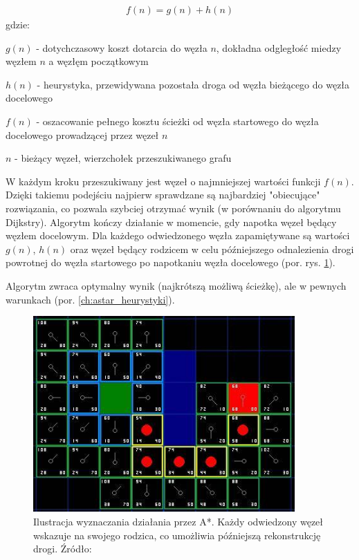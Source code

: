 \begin{gather}
 	f(n) = g(n) + h(n)
 	\label{eq_astar} 
\end{gather}
 gdzie:

 $g(n)$ - dotychczasowy koszt dotarcia do węzła $n$, dokładna odgległość miedzy węzłem $n$ a węzłęm początkowym

 $h(n)$ - heurystyka, przewidywana pozostała droga od węzła bieżącego do węzła docelowego

 $f(n)$ - oszacowanie pełnego kosztu ścieżki od węzła startowego do węzła docelowego prowadzącej przez węzeł $n$

 $n$ - bieżący węzeł, wierzchołek przeszukiwanego grafu

W każdym kroku przeszukiwany jest węzeł o najmniejszej wartości funkcji $f(n)$.
Dzięki takiemu podejściu najpierw sprawdzane są najbardziej "obiecujące" rozwiązania, co pozwala szybciej otrzymać wynik (w porównaniu do algorytmu Dijkstry).
Algorytm kończy działanie w momencie, gdy napotka węzeł będący węzłem docelowym.
Dla każdego odwiedzonego węzła zapamiętywane są wartości $g(n)$, $h(n)$ oraz węzeł będący rodzicem w celu późniejszego odnalezienia drogi powrotnej do węzła startowego po napotkaniu węzła docelowego (por. rys. \ref{fig:image_astar2}).

Algorytm zwraca optymalny wynik (najkrótszą możliwą ścieżkę), ale w pewnych warunkach (por. \ref{ch:astar_heurystyki}).

\begin{figure}
	\centering
	\includegraphics[width=10cm]{img/astar-t7}
	\caption{Ilustracja wyznaczania działania przez A*. Każdy odwiedzony węzeł wskazuje na swojego rodzica, co umożliwia późniejszą rekonstrukcję drogi. Źródło: \cite{astar2}}
	\label{fig:image_astar2}
\end{figure}


